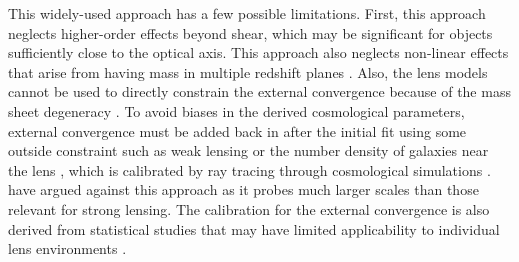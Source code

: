 This widely-used approach has a few possible limitations. First, this approach neglects higher-order effects beyond shear, which may be significant for objects sufficiently close to the optical axis. This approach also neglects non-linear effects that arise from having mass in multiple redshift planes \citep[][]{McCully14,Jaroszynski12}. Also, the lens models cannot be used to directly constrain the external convergence because of the mass sheet degeneracy \cite{Falco85}.  To avoid biases in the derived cosmological parameters, external convergence must be added back in after the initial fit using some outside constraint such as weak lensing \citep{Nakajima09, Fadely10} or the number density of galaxies near the lens \citep{Suyu10, Suyu13, Collett13}, which is calibrated by ray tracing through cosmological simulations \citep[e.g.,][]{Hilbert09}. \citet{Schneider13} have argued against this approach as it probes much larger scales than those relevant for strong lensing. The calibration for the external convergence is also derived from statistical studies that may have limited applicability to individual lens environments \citep{Wong11}.
